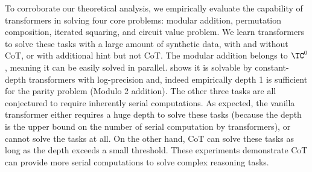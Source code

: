
To corroborate our theoretical analysis, we empirically evaluate the capability of transformers in solving four core problems: modular addition, permutation composition, iterated squaring, and circuit value problem. 
We learn transformers to solve these tasks with a large amount of synthetic data, with and without CoT, or with additional hint but not CoT.  The modular addition belongs to $\TC^0$, meaning it can be easily solved in parallel. \citet{liu2022transformers} shows it is solvable by constant-depth transformers with log-precision and, indeed empirically depth 1 is sufficient for the parity problem (Modulo 2 addition). The other three tasks are all conjectured to require inherently serial computations. As expected, the vanilla transformer either requires a huge depth to solve these tasks (because the depth is the upper bound on the number of serial computation by transformers), or cannot solve the tasks at all. On the other hand, CoT can solve these tasks as long as the depth exceeds a small threshold. These experiments demonstrate CoT can provide more serial computations to solve complex reasoning tasks. 


%





